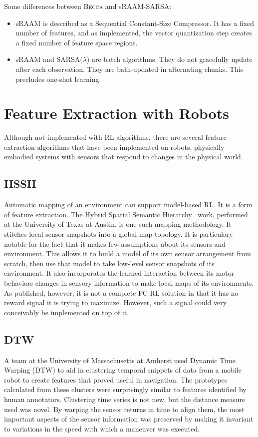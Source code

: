 Some differences between \textsc{Becca} and sRAAM-SARSA:

\begin{itemize}
\item sRAAM is described as a Sequential Constant-Size Compressor. It has a fixed number of features, and as implemented, the vector quantization step creates a fixed number of feature space regions.
\item sRAAM and SARSA($\lambda$) are batch algorithms. They do not gracefully update after each observation. They are bath-updated in alternating chunks. This precludes one-shot learning.
\end{itemize}


\section{Feature Extraction with Robots}

Although not implemented with RL algorithms, there are several feature extraction algorithms that have been implemented on robots, physically embodied systems with sensors that respond to changes in the physical world.

\subsection{HSSH} 
Automatic mapping of an environment can support model-based RL. It is a form of feature extraction. The Hybrid Spatial Semantic Hierarchy~\cite{pierce97,beeson10} work, performed at the University of Texas at Austin, is one such mapping methodology. It stitches local sensor snapshots into a global map topology. It is particulary notable for the fact that it makes few assumptions about its sensors and environment. This allows it to build a model of its own sensor arrangement from scratch, then use that model to take low-level sensor snapshots of its environment. It also incorporates the learned interaction between its motor behaviors changes in sensory information to make local maps of its environments. As published, however, it is not a complete FC-RL solution in that it has no reward signal it is trying to maximize. However, such a signal could very conceivably be implemented on top of it.

\subsection{DTW} 
A team at the University of Massachusetts at Amherst used Dynamic Time Warping (DTW) to aid in clustering temporal snippets of data from a mobile robot to create features that proved useful in navigation. The prototypes calculated from these clusters were surprisingly similar to features identified by human annotators. Clustering time series is not new, but the distance measure used was novel. By warping the sensor returns in time to align them, the most important aspects of the sensor information was preserved by making it invariant to variations in the speed with which a maneuver was executed.


